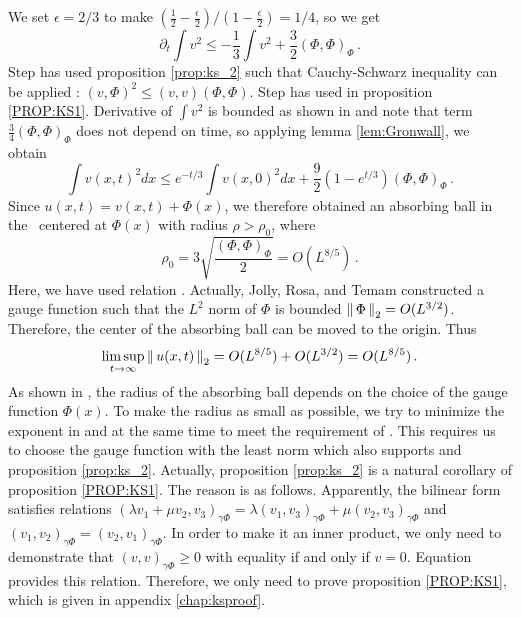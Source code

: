We set $\epsilon = 2/3$ to make
$(\frac{1}{2}-\frac{\epsilon}{2})/(1 - \frac{\epsilon}{2}) = 1/4$, so we get
\begin{equation}
  \label{eq:ks_v2_bound}
  \partial_t \int v^2 \le -\frac{1}{3} \int v^2 + \frac{3}{2}(\Phi, \Phi)_{\Phi}
  \,.
\end{equation}
Step  has used
proposition \ref{prop:ks_2} such that Cauchy-Schwarz inequality can be
applied : $(v, \Phi)^2 \le (v, v)(\Phi, \Phi)$. Step 
has used  in proposition \ref{PROP:KS1}. Derivative
of $\int v^2$ is bounded as shown in  and note that
term $\frac{3}{4}(\Phi, \Phi)_{\Phi}$ does not depend on time, so applying
lemma \ref{lem:Gronwall}, we obtain
\begin{equation}
  \label{eq:eq:ks_v2_bound2}
  \int v(x, t)^2 dx \le e^{-t/3}\int v(x, 0)^2 dx + \frac{9}{2}(1-e^{t/3})
  (\Phi, \Phi)_{\Phi}
  \,.
\end{equation}
Since $u(x, t) = v(x, t)+ \Phi(x)$, we therefore obtained an absorbing ball in the \KSe\
centered at $\Phi(x)$
with radius $\rho > \rho_0$, where
\begin{equation}
  \label{eq:ks_radius}
  \rho_0 = 3\sqrt{\frac{(\Phi, \Phi)_{\Phi}}{2}}  = O (L^{8/5})
  \,.
\end{equation}
Here, we have used relation .
Actually, Jolly, Rosa,
and Temam constructed a gauge function
such that the $L^2$ norm of $\Phi$ is bounded
$\left\Arrowvert \, \Phi \, \right\Arrowvert_2 = O(L^{3/2})$. Therefore, the center of the
absorbing ball can be moved to the origin. Thus
\[
  \limsup_{t\to\infty} \left\Arrowvert \, u(x, t) \, \right\Arrowvert_2 =   O(L^{8/5}) +  O(L^{3/2}) = O(L^{8/5})
  \,.
\]
As shown in ,
the radius of the absorbing ball depends on the choice of the gauge function
$\Phi(x)$. To make the radius as small as possible,
we try to minimize the exponent in  and at the same time
to meet the requirement of  \refeq{eq:ks_prop_1}. This requires us to
choose the gauge function with the least norm which also supports
\refeq{eq:ks_prop_2} and proposition \ref{prop:ks_2}.
Actually, proposition  \ref{prop:ks_2} is a natural corollary of proposition
\ref{PROP:KS1}. The reason is as follows.
Apparently, the bilinear form  satisfies
relations
$(\lambda v_1 + \mu v_2, v_3)_{\gamma \Phi} = \lambda (v_1, v_3)_{\gamma \Phi}
+ \mu (v_2, v_3)_{\gamma \Phi}$ and
$(v_1, v_2)_{\gamma \Phi} = (v_2, v_1)_{\gamma \Phi}$. In order to
make it an inner product, we only need to
demonstrate that $(v, v)_{\gamma \Phi} \ge 0$
with equality if and only if $v = 0$. Equation 
provides this relation. Therefore, we only
need to prove proposition \ref{PROP:KS1}, which is given in
appendix \ref{chap:ksproof}.

